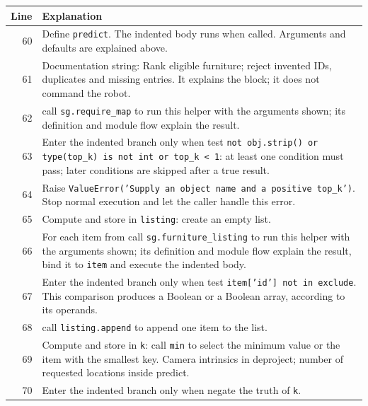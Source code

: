 \documentclass[11pt,a4paper]{book}
\begin{document}
\begin{longtable}{r p{}}

\textbf{Line} & \textbf{Explanation} \\ \hline \endhead

60 & Define \texttt{predict}. The indented body runs when called. Arguments and defaults are explained above. \\

61 & Documentation string: Rank eligible furniture; reject invented IDs, duplicates and missing entries. It explains the block; it does not command the robot. \\

62 & call \texttt{sg.require\_map} to run this helper with the arguments shown; its definition and module flow explain the result. \\

63 & Enter the indented branch only when test \texttt{not obj.strip() or type(top\_k) is not int or top\_k < 1}: at least one condition must pass; later conditions are skipped after a true result. \\

64 & Raise \texttt{ValueError('Supply an object name and a positive top\_k')}. Stop normal execution and let the caller handle this error. \\

65 & Compute and store in \texttt{listing}: create an empty list.  \\

66 & For each item from call \texttt{sg.furniture\_listing} to run this helper with the arguments shown; its definition and module flow explain the result, bind it to \texttt{item} and execute the indented body. \\

67 & Enter the indented branch only when test \texttt{item['id'] not in exclude}. This comparison produces a Boolean or a Boolean array, according to its operands. \\

68 & call \texttt{listing.append} to append one item to the list. \\

69 & Compute and store in \texttt{k}: call \texttt{min} to select the minimum value or the item with the smallest key. Camera intrinsics in deproject; number of requested locations inside predict. \\

70 & Enter the indented branch only when negate the truth of \texttt{k}. \\


\end{longtable}
\end{document}
